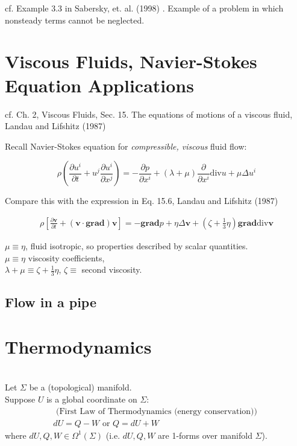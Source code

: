 cf. Example 3.3 in Sabersky, et. al. (1998) \cite{dgdt:SAHG1998}. Example of a problem in which nonsteady terms cannot be neglected. 

\section{Viscous Fluids, Navier-Stokes Equation Applications}

cf. Ch. 2, Viscous Fluids, Sec. 15. The equations of motions of a viscous fluid, Landau and Lifshitz (1987) \cite{dgdt:LLandauELifshitz1987}

Recall Navier-Stokes equation for \emph{compressible, viscous} fluid flow:

\begin{equation}
\boxed{
\rho \left( \frac{\partial u^i }{ \partial t} + u^j \frac{ \partial u^i }{ \partial x^j } \right) = - \frac{ \partial p }{ \partial x^i } + (\lambda + \mu ) \frac{\partial }{ \partial x^i } \text{div} u + \mu \Delta u^i
}
\end{equation}

Compare this with the expression in Eq. 15.6, Landau and Lifshitz (1987) \cite{dgdt:LLandauELifshitz1987}

\begin{equation}
\begin{gathered}
	\rho \left[ \frac{ \partial \mathbf{v}}{ \partial t } + (\mathbf{v} \cdot \textbf{grad} ) \mathbf{v} \right] = -\textbf{grad} p + \eta \Delta \mathbf{v} + (\zeta + \frac{1}{3} \eta) \textbf{grad} \text{div} \mathbf{v}
\end{gathered}
\end{equation}

$\mu \equiv \eta$, fluid isotropic, so properties described by scalar quantities. \\
$\mu \equiv \eta$ viscosity coefficients, \\
$\lambda + \mu \equiv \zeta + \frac{1}{3} \eta$, $\zeta \equiv $ second viscosity.

\subsection{Flow in a pipe}



\section{Thermodynamics}

\quad \\ 
Let $\Sigma$ be a (topological) manifold. \\
Suppose $U$ is a global coordinate on $\Sigma$:
\begin{equation}
\begin{gathered}
\text{ (First Law of Thermodynamics (energy conservation)) } \\
\boxed{ dU = Q - W \text{ or } Q = dU + W }
\end{gathered}
\end{equation}
where $dU, Q, W \in \Omega^1(\Sigma)$ (i.e. $dU, Q, W$ are 1-forms over manifold $\Sigma$).


